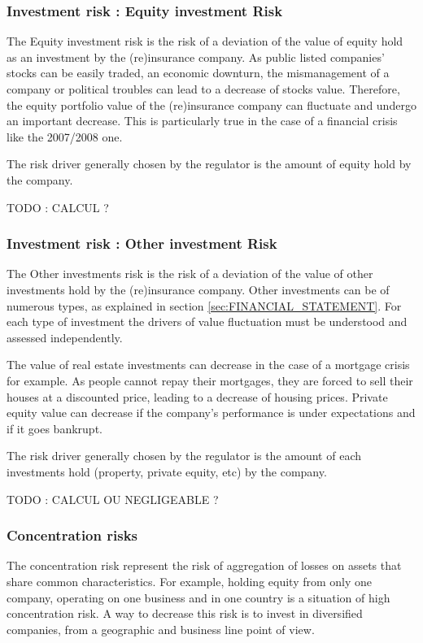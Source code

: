 \subsubsection{Investment risk : Equity investment Risk}

The Equity investment risk is the risk of a deviation of the value of equity hold as an investment by the (re)insurance company. As public listed companies' stocks can be easily traded, an economic downturn, the mismanagement of a company or political troubles can lead to a decrease of stocks value. Therefore, the equity portfolio value of the (re)insurance company can fluctuate and undergo an important decrease. This is particularly true in the case of a financial crisis like the 2007/2008 one.

The risk driver generally chosen by the regulator is the amount of equity hold by the company.


TODO : CALCUL ?

\subsubsection{Investment risk : Other investment Risk}

The Other investments risk is the risk of a deviation of the value of other investments hold by the (re)insurance company. Other investments can be of numerous types, as explained in section \ref{sec:FINANCIAL_STATEMENT}. For each type of investment the drivers of value fluctuation must be understood and assessed independently.

The value of real estate investments can decrease in the case of a mortgage crisis for example. As people cannot repay their mortgages, they are forced to sell their houses at a discounted price, leading to a decrease of housing prices. 
Private equity value can decrease if the company's performance is under expectations and if it goes bankrupt.

The risk driver generally chosen by the regulator is the amount of each investments hold (property, private equity, etc) by the company.

TODO : CALCUL OU NEGLIGEABLE ?

\subsubsection{Concentration risks}

The concentration risk represent the risk of aggregation of losses on assets that share common characteristics. For example, holding equity from only one company, operating on one business and in one country is a situation of high concentration risk. A way to decrease this risk is to invest in diversified companies, from a geographic and business line point of view.

